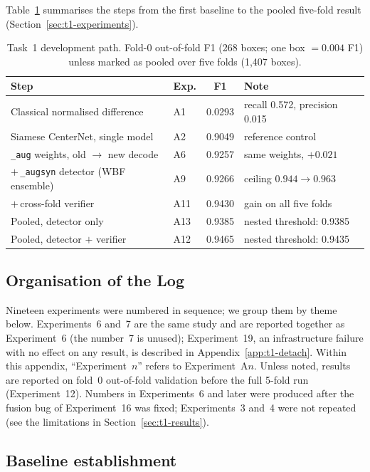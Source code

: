 Table~\ref{tab:t1-path} summarises the steps from the first baseline to the pooled
five-fold result (Section~\ref{sec:t1-experiments}).

\begin{table}[h]
\caption{Task~1 development path. Fold-0 out-of-fold F1 (268 boxes; one box
$=0.004$ F1) unless marked as pooled over five folds (1{,}407 boxes).}
\label{tab:t1-path}
\centering
\small
\begin{tabular}{llcl}
\toprule
Step & Exp. & F1 & Note \\
\midrule
Classical normalised difference & A1 & 0.0293 & recall 0.572, precision 0.015 \\
Siamese CenterNet, single model & A2 & 0.9049 & reference control \\
\texttt{\_aug} weights, old $\rightarrow$ new decode & A6 & 0.9257 & same weights, $+0.021$ \\
$+$\,\texttt{\_augsyn} detector (WBF ensemble) & A9 & 0.9266 & ceiling $0.944\rightarrow0.963$ \\
$+$\,cross-fold verifier & A11 & 0.9430 & gain on all five folds \\
Pooled, detector only & A13 & 0.9385 & nested threshold: 0.9385 \\
Pooled, detector $+$ verifier & A12 & 0.9465 & nested threshold: 0.9435 \\
\bottomrule
\end{tabular}
\end{table}

\subsection{Organisation of the Log}

Nineteen experiments were numbered in sequence; we group them by theme below. Experiments~6 and~7 are the same study and are reported together as Experiment~6 (the number~7 is unused); Experiment~19, an infrastructure failure with no effect on any result, is described in Appendix~\ref{app:t1-detach}. Within this appendix, ``Experiment~$n$'' refers to Experiment~A$n$. Unless noted, results are reported on fold~0 out-of-fold validation before the full 5-fold run (Experiment~12). Numbers in Experiments~6 and later were produced after the fusion bug of Experiment~16 was fixed; Experiments~3 and~4 were not repeated (see the limitations in Section~\ref{sec:t1-results}).

\subsection{Baseline establishment}


